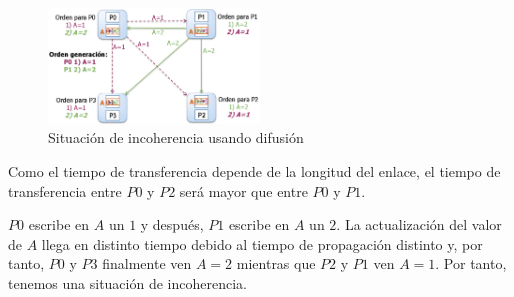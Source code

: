 \documentclass[10pt,a4paper,spanish]{report}
\begin{document}
\begin{figure}[!h]
\centering
\includegraphics[width=0.5\textwidth]{69}
\caption{Situación de incoherencia usando difusión}
\label{incoherencia_caches}
\end{figure}

Como el tiempo de transferencia depende de la longitud del enlace, el tiempo de transferencia entre $P0$ y $P2$ será mayor que entre $P0$ y $P1$.

$P0$ escribe en $A$ un $1$ y después, $P1$ escribe en $A$ un $2$. La actualización del valor de $A$ llega en distinto tiempo debido al tiempo de propagación distinto y, por tanto, $P0$ y $P3$ finalmente ven $A=2$ mientras que $P2$ y $P1$ ven $A=1$. Por tanto, tenemos una situación de incoherencia.
\end{document}
